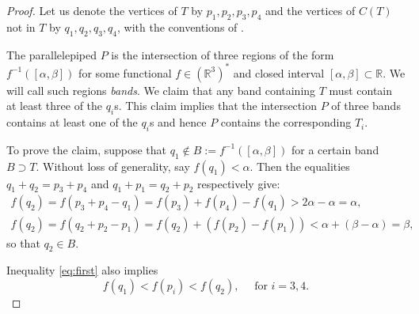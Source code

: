 \documentclass{amsart}
\theoremstyle{plain}
\theoremstyle{definition}
\newcommand{\R}{ \ensuremath{\mathbb{R}}}
\newcommand{\paco}[1]{\todo[size=\tiny,color=green!30]{#1 \\ \hfill --- P.}}
\begin{document}
\begin{proof}
Let us denote the vertices of $T$ by $p_1, p_2, p_3, p_4$ and the vertices of $C(T)$ not in $T$ by $q_1, q_2, q_3, q_4$, with the conventions of . 

\paco{changed this}
The parallelepiped $P$ is the intersection of three regions of the form $f^{-1}([\alpha,\beta])$ for some functional $f\in (\R^3)^*$ and closed interval $[\alpha,\beta]\subset \R$. We will call such regions \emph{bands}. We claim that any band containing $T$ must contain at least three of the $q_i$s. This claim implies that the intersection $P$ of three bands contains at least one of the $q_i$s and hence $P$ contains the corresponding $T_i$.

To prove the claim, suppose that $q_1\not\in B:= f^{-1}([\alpha,\beta])$ for a certain band $B \supset T$. 
Without loss of generality, say $f(q_1)<\alpha$. Then the equalities $q_1+q_2=p_3+p_4$ and $q_1+p_1=q_2+p_2$ respectively give:
\begin{gather}
\label{eq:first}
f(q_2) = f(p_3+p_4-q_1) = f(p_3)+f(p_4)-f(q_1) > 2\alpha-\alpha=\alpha,\\
\label{eq:second}
f(q_2) = f(q_2+p_2-p_1) = f(q_2)+(f(p_2)-f(p_1)) < \alpha + (\beta-\alpha) = \beta,
\end{gather}
so that $q_2 \in B$.

Inequality \eqref{eq:first} also implies
\begin{equation}
\label{eq:third}
f(q_1) <  f(p_i) < f(q_2), \quad\text{ for $i=3,4$}.
\end{equation}


\end{proof}
\end{document}
